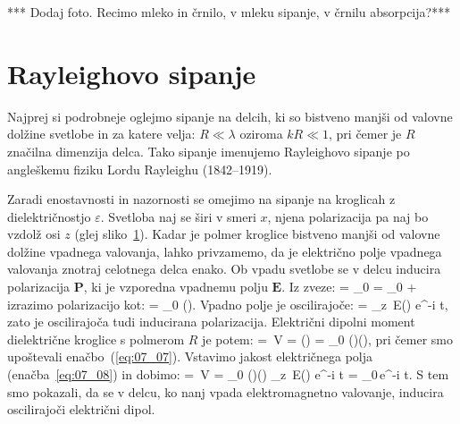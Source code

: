 *** Dodaj foto. Recimo mleko in črnilo, v mleku sipanje, v črnilu absorpcija?***

\section{Rayleighovo sipanje}
Najprej si podrobneje oglejmo sipanje na delcih, ki so bistveno manjši 
od valovne dolžine svetlobe in za katere velja: $R \ll \lambda$ oziroma 
$kR \ll 1$, pri čemer je $R$ značilna dimenzija delca. Tako sipanje imenujemo 
Rayleighovo sipanje po angleškemu fiziku Lordu Rayleighu (1842--1919). 

Zaradi enostavnosti in nazornosti se omejimo na sipanje na 
kroglicah z dielektričnostjo $\varepsilon$. Svetloba naj se širi v smeri
$x$, njena polarizacija pa naj bo vzdolž osi $z$ (glej sliko~\ref{}).
Kadar je polmer kroglice bistveno manjši od
valovne dolžine vpadnega valovanja, lahko privzamemo, da je električno polje 
vpadnega valovanja znotraj celotnega delca enako. 
Ob vpadu svetlobe  se v delcu inducira polarizacija $\mathbf{P}$, ki je 
vzporedna vpadnemu polju $\mathbf{E}$. Iz zveze:
\beq
{} = \varepsilon \varepsilon_0  = \varepsilon_0  + 
\label{eq:07_06}
\eeq
izrazimo polarizacijo kot:
\beq
{} = \varepsilon_0 ().
\label{eq:07_07}
\eeq
Vpadno polje je oscilirajoče:
\beq
{} = _z\, E() e^{-i \omega t},
\label{eq:07_08}
\eeq
zato je oscilirajoča tudi inducirana polarizacija. Električni dipolni
moment dielektrične kroglice s polmerom $R$ je potem:
\beq
{} = \,V = \left(\right) = 
\varepsilon_0 ()\left(\right),
\label{eq:07_09}
\eeq
pri čemer smo upoštevali enačbo~(\ref{eq:07_07}). Vstavimo jakost električnega
polja (enačba~\ref{eq:07_08}) in dobimo:
\beq
{} = \,V = 
\varepsilon_0 ()\left(\right)
_z\, E() e^{-i \omega t} = _0\,e^{-i \omega t}.
\label{eq:07_09a}
\eeq
S tem smo pokazali, da se v delcu, ko nanj vpada elektromagnetno valovanje, 
inducira oscilirajoči električni dipol. 

